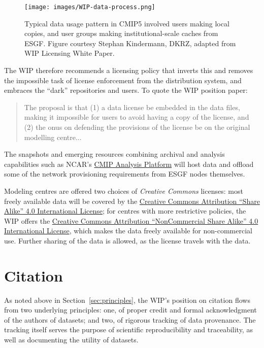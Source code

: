 \documentclass[gmd,manuscript]{copernicus}
\newcommand{\secref}[1] {\mbox{Section  \ref{sec:#1}}}
\begin{document}
\begin{figure*}
  \begin{center}
    \texttt{[image: images/WIP-data-process.png]}
  \end{center}
  \caption{Typical data usage pattern in CMIP5 involved users making
    local copies, and user groups making institutional-scale caches
    from ESGF. Figure courtesy Stephan Kindermann, DKRZ, adapted from
    WIP Licensing White Paper.}
  \label{fig:dark}
\end{figure*}

The WIP therefore recommends a licensing policy that inverts this and
removes the impossible task of license enforcement from the
distribution system, and embraces the ``dark'' repositories and users.
To quote the WIP position paper:

\begin{quote}
  The proposal is that (1) a data license be embedded in the data
  files, making it impossible for users to avoid having a copy of the
  license, and (2) the onus on defending the provisions of the license
  be on the original modelling centre...
\end{quote}

The snapshots and emerging resources combining archival and analysis
capabilities such as NCAR's \href{https://goo.gl/sYTxC2}{CMIP
  Analysis Platform} will host data and offload some of the network
provisioning requirements from ESGF nodes themselves.

Modeling centres are offered two choices of \emph{Creative Commons
}licenses: most freely available data will be covered by the
\href{https://goo.gl/CY5m2v}{Creative Commons Attribution ``Share
  Alike'' 4.0 International License}; for centres with more
restrictive policies, the WIP offers the
\href{https://goo.gl/KUNUKq}{Creative Commons Attribution
  ``NonCommercial Share Alike'' 4.0 International License}, which
makes the data freely available for non-commercial use. Further
sharing of the data is allowed, as the license travels with the data.

\section{Citation}
\label{sec:cite}

As noted above in \secref{principles}, the WIP's position on citation
flows from two underlying principles: one, of proper credit and formal
acknowledgment of the authors of datasets; and two, of rigorous
tracking of data provenance. The tracking itself serves the purpose of
scientific reproducibility and traceability, as well as documenting
the utility of datasets.
\end{document}
